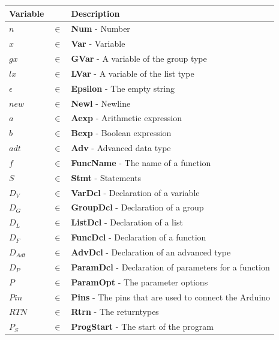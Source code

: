 \begin{table}[H]
\centering
\begin{tabular}{@{}lll@{}}
\toprule
Variable &       & Description                      \\ \midrule
$n$        & $\in$ & \textbf{Num} - Number                     \\
$x$        & $\in$ & \textbf{Var} - Variable                     \\
$gx$        & $\in$ & \textbf{GVar} - A variable of the group type                     \\
$lx$        & $\in$ & \textbf{LVar} - A variable of the list type                     \\
$\epsilon$ & $\in$ & \textbf{Epsilon} - The empty string \\
$new$      & $\in$ &  \textbf{Newl} - Newline                   \\
$a$        & $\in$ & \textbf{Aexp} - Arithmetic expression                    \\
$b$        & $\in$ & \textbf{Bexp} - Boolean expression                    \\
$adt$        & $\in$ & \textbf{Adv} - Advanced data type                     \\
$f$       & $\in$ & \textbf{FuncName} - The name of a function      \\
$S$        & $\in$ & \textbf{Stmt} - Statements               \\
$D_V$       & $\in$ & \textbf{VarDcl} - Declaration of a variable \\
$D_G$       & $\in$ & \textbf{GroupDcl} - Declaration of a group \\
$D_L$       & $\in$ & \textbf{ListDcl} - Declaration of a list \\
$D_F$       & $\in$ & \textbf{FuncDcl} - Declaration of a function \\
$D_{Adt}$       & $\in$ & \textbf{AdvDcl} - Declaration of an advanced type      \\
$D_P$       & $\in$ & \textbf{ParamDcl} - Declaration of parameters for a function \\
$P$       & $\in$ & \textbf{ParamOpt} - The parameter options \\
$Pin$      & $\in$ &  \textbf{Pins} - The pins that are used to connect the Arduino \\
$RTN$       & $\in$ & \textbf{Rtrn} - The returntypes \\
$P_S$        & $\in$ & \textbf{ProgStart} - The start of the program \\

\end{tabular}
\end{table}
